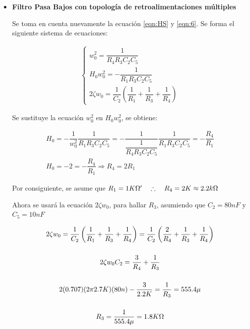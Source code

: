 \begin{enumerate}
\begin{itemize}
                \item \textbf{Filtro Pasa Bajos con topología de retroalimentaciones múltiples}

                    Se toma en cuenta nuevamente la ecuación \ref{eqn:HS} y \ref{eqn:6}. Se forma el siguiente sistema de ecuaciones:

                    \begin{gather*}
                        \begin{cases}
                            w_0^2=\dfrac{1}{R_4R_3C_2C_5}\\[0.5cm]
                            H_0w_0^2=-\dfrac{1}{R_1R_3C_2C_5}\\[0.5cm]
                            2\zeta w_0=\dfrac{1}{C_2}\left(\dfrac{1}{R_1}+\dfrac{1}{R_3}+\dfrac{1}{R_4}\right)
                        \end{cases}
                    \end{gather*}

                    Se sustituye la ecuación $w_0^2$ en $H_0w_0^2$, se obtiene:

                    \begin{gather*}
                        H_0=-\dfrac{1}{w_0^2}\dfrac{1}{R_1R_3C_2C_5}=-\dfrac{1}{\dfrac{1}{R_4R_3C_2C_5}}\dfrac{1}{R_1R_3C_2C_5}=-\dfrac{R_4}{R_1}\\[0.5cm]
                        H_0=-2=-\dfrac{R_4}{R_1} \Longrightarrow R_4=2R_1
                    \end{gather*}

                    Por consiguiente, se asume que $R_1=1K\ohm '\quad \therefore \quad R_4=2K \approx 2.2k\ohm$

                    Ahora se usará la ecuación $2\zeta w_0$, para hallar $R_3$, asumiendo que $C_2=80nF$ y $C_5=10nF$

                    \begin{gather*}
                        2\zeta w_0=\dfrac{1}{C_2}\left(\dfrac{1}{R_1}+\dfrac{1}{R_3}+\dfrac{1}{R_4}\right)=\dfrac{1}{C_2}\left(\dfrac{2}{R_4}+\dfrac{1}{R_3}+\dfrac{1}{R_4}\right)\\[0.5cm]
                        2\zeta w_0C_2=\dfrac{3}{R_4}+\dfrac{1}{R_3}\\[0.5cm]
                        2(0.707)(2 \pi 2.7K)(80n)-\dfrac{3}{2.2K}=\dfrac{1}{R_3}=555.4\mu\\[0.5cm]
                        R_3=\dfrac{1}{555.4\mu}=1.8K\ohm
                    \end{gather*}


\end{itemize}
\end{enumerate}
